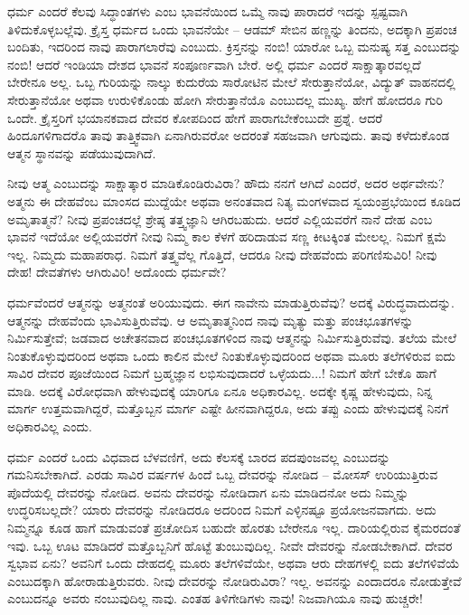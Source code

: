 ಧರ್ಮ ಎಂದರೆ ಕೆಲವು ಸಿದ್ಧಾಂತಗಳು ಎಂಬ ಭಾವನೆಯಿಂದ ಒಮ್ಮೆ ನಾವು ಪಾರಾದರೆ ಇದನ್ನು ಸ್ಪಷ್ಟವಾಗಿ ತಿಳಿದುಕೊಳ್ಳಬಲ್ಲೆವು. ಕ್ರೈಸ್ತ ಧರ್ಮದ ಒಂದು ಭಾವನೆಯೇ – ಆಡಮ್​ ಸೇಬಿನ ಹಣ್ಣನ್ನು ತಿಂದನು, ಅದಕ್ಕಾಗಿ ಪ್ರಪಂಚ ಬಂದಿತು, ಇದರಿಂದ ನಾವು ಪಾರಾಗಲಾರೆವು ಎಂಬುದು. ಕ್ರಿಸ್ತನನ್ನು ನಂಬಿ! ಯಾರೋ ಒಬ್ಬ ಮನುಷ್ಯ ಸತ್ತ ಎಂಬುದನ್ನು ನಂಬಿ! ಆದರೆ ಇಂಡಿಯಾ ದೇಶದ ಭಾವನೆ ಸಂಪೂರ್ಣವಾಗಿ ಬೇರೆ. ಅಲ್ಲಿ ಧರ್ಮ ಎಂದರೆ ಸಾಕ್ಷಾತ್ಕಾರವಲ್ಲದೆ ಬೇರೇನೂ ಅಲ್ಲ. ಒಬ್ಬ ಗುರಿಯನ್ನು ನಾಲ್ಕು ಕುದುರೆಯ ಸಾರೋಟಿನ ಮೇಲೆ ಸೇರುತ್ತಾನೆಯೋ, ವಿದ್ಯುತ್​ ವಾಹನದಲ್ಲಿ ಸೇರುತ್ತಾನೆಯೋ ಅಥವಾ ಉರುಳಿಕೊಂಡು ಹೋಗಿ ಸೇರುತ್ತಾನೆಯೊ ಎಂಬುದಲ್ಲ ಮುಖ್ಯ. ಹೇಗೆ ಹೋದರೂ ಗುರಿ ಒಂದೇ. ಕ್ರೈಸ್ತರಿಗೆ ಭಯಾನಕವಾದ ದೇವರ ಕೋಪದಿಂದ ಹೇಗೆ ಪಾರಾಗಬೇಕೆಂಬುದೇ ಪ್ರಶ್ನೆ. ಆದರೆ ಹಿಂದೂಗಳಿಗಾದರೊ ತಾವು ತಾತ್ತ್ವಿಕವಾಗಿ ಏನಾಗಿರುವರೋ ಅದರಂತೆ ಸಹಜವಾಗಿ ಆಗುವುದು. ತಾವು ಕಳೆದುಕೊಂಡ ಆತ್ಮನ ಸ್ಥಾನವನ್ನು ಪಡೆಯುವುದಾಗಿದೆ.

ನೀವು ಆತ್ಮ ಎಂಬುದನ್ನು ಸಾಕ್ಷಾತ್ಕಾರ ಮಾಡಿಕೊಂಡಿರುವಿರಾ? ಹೌದು ನನಗೆ ಆಗಿದೆ ಎಂದರೆ, ಅದರ ಅರ್ಥವೇನು? ಅತ್ಮನು ಈ ದೇಹವೆಂಬ ಮಾಂಸದ ಮುದ್ದೆಯೇ ಅಥವಾ ಅನಂತವಾದ ನಿತ್ಯ ಮಂಗಳವಾದ ಸ್ವಯಂಪ್ರಭೆಯಿಂದ ಕೂಡಿದ ಅಮೃತಾತ್ಮನೆ? ನೀವು ಪ್ರಪಂಚದಲ್ಲೆ ಶ್ರೇಷ್ಠ ತತ್ತ್ವಜ್ಞಾನಿ ಆಗಿರಬಹುದು. ಆದರೆ ಎಲ್ಲಿಯವರೆಗೆ ನಾನೆ ದೇಹ ಎಂಬ ಭಾವನೆ ಇದೆಯೋ ಅಲ್ಲಿಯವರೆಗೆ ನೀವು ನಿಮ್ಮ ಕಾಲ ಕೆಳಗೆ ಹರಿದಾಡುವ ಸಣ್ಣ ಕೀಟಕ್ಕಿಂತ ಮೇಲಲ್ಲ. ನಿಮಗೆ ಕ್ಷಮೆ ಇಲ್ಲ. ನಿಮ್ಮದು ಮಹಾಪರಾಧ. ನಿಮಗೆ ತತ್ತ್ವವೆಲ್ಲ ಗೊತ್ತಿದೆ, ಆದರೂ ನೀವು ದೇಹವೆಂದು ಪರಿಗಣಿಸುವಿರಿ! ನೀವು ದೇಹ! ದೇವತೆಗಳು ಆಗಿರುವಿರಿ! ಅದೊಂದು ಧರ್ಮವೇ?

ಧರ್ಮವೆಂದರೆ ಆತ್ಮನನ್ನು ಅತ್ಮನಂತೆ ಅರಿಯುವುದು. ಈಗ ನಾವೇನು ಮಾಡುತ್ತಿರುವೆವು? ಅದಕ್ಕೆ ವಿರುದ್ಧವಾದುದನ್ನು. ಆತ್ಮನನ್ನು ದೇಹವೆಂದು ಭಾವಿಸುತ್ತಿರುವೆವು. ಆ ಅಮೃತಾತ್ಮನಿಂದ ನಾವು ಮೃತ್ಯು ಮತ್ತು ಪಂಚಭೂತಗಳನ್ನು ನಿರ್ಮಿಸುತ್ತೇವೆ; ಜಡವಾದ ಅಚೇತನವಾದ ಪಂಚಭೂತಗಳಿಂದ ನಾವು ಆತ್ಮನನ್ನು ನಿರ್ಮಿಸುತ್ತಿರುವೆವು. ತಲೆಯ ಮೇಲೆ ನಿಂತುಕೊಳ್ಳುವುದರಿಂದ ಅಥವಾ ಒಂದು ಕಾಲಿನ ಮೇಲೆ ನಿಂತುಕೊಳ್ಳುವುದರಿಂದ ಅಥವಾ ಮೂರು ತಲೆಗಳಿರುವ ಐದು ಸಾವಿರ ದೇವರ ಪೂಜೆಯಿಂದ ನಿಮಗೆ ಬ್ರಹ್ಮಜ್ಞಾನ ಲಭಿಸುವುದಾದರೆ ಒಳ್ಳೆಯದು...! ನಿಮಗೆ ಹೇಗೆ ಬೇಕೊ ಹಾಗೆ ಮಾಡಿ. ಅದಕ್ಕೆ ವಿರೋಧವಾಗಿ ಹೇಳುವುದಕ್ಕೆ ಯಾರಿಗೂ ಏನೂ ಅಧಿಕಾರವಿಲ್ಲ. ಅದಕ್ಕೇ ಕೃಷ್ಣ ಹೇಳುವುದು, ನಿನ್ನ ಮಾರ್ಗ ಉತ್ತಮವಾಗಿದ್ದರೆ, ಮತ್ತೊಬ್ಬನ ಮಾರ್ಗ ಎಷ್ಟೇ ಹೀನವಾಗಿದ್ದರೂ, ಅದು ತಪ್ಪು ಎಂದು ಹೇಳುವುದಕ್ಕೆ ನಿನಗೆ ಅಧಿಕಾರವಿಲ್ಲ ಎಂದು.

ಧರ್ಮ ಎಂದರೆ ಒಂದು ವಿಧವಾದ ಬೆಳವಣಿಗೆ, ಅದು ಕೆಲಸಕ್ಕೆ ಬಾರದ ಪದಪುಂಜವಲ್ಲ ಎಂಬುದನ್ನು ಗಮನಿಸಬೇಕಾಗಿದೆ. ಎರಡು ಸಾವಿರ ವರ್ಷಗಳ ಹಿಂದೆ ಒಬ್ಬ ದೇವರನ್ನು ನೋಡಿದ – ಮೋಸಸ್​ ಉರಿಯುತ್ತಿರುವ ಪೊದೆಯಲ್ಲಿ ದೇವರನ್ನು ನೋಡಿದ. ಅವನು ದೇವರನ್ನು ನೋಡಿದಾಗ ಏನು ಮಾಡಿದನೋ ಅದು ನಿಮ್ಮನ್ನು ಉದ್ಧರಿಸಬಲ್ಲದೇ? ಯಾರು ದೇವರನ್ನು ನೋಡಿದರೂ ಅದರಿಂದ ನಿಮಗೆ ಎಳ್ಳಿನಷ್ಟೂ ಪ್ರಯೋಜನವಾಗದು. ಅದು ನಿಮ್ಮನ್ನೂ ಕೂಡ ಹಾಗೆ ಮಾಡುವಂತೆ ಪ್ರಚೋದಿಸ ಬಹುದೇ ಹೊರತು ಬೇರೇನೂ ಇಲ್ಲ. ದಾರಿಯಲ್ಲಿರುವ ಕೈಮರದಂತೆ ಇವು. ಒಬ್ಬ ಊಟ ಮಾಡಿದರೆ ಮತ್ತೊಬ್ಬನಿಗೆ ಹೊಟ್ಟೆ ತುಂಬುವುದಿಲ್ಲ. ನೀವೇ ದೇವರನ್ನು ನೋಡಬೇಕಾಗಿದೆ. ದೇವರ ಸ್ವಭಾವ ಏನು? ಅವನಿಗೆ ಒಂದು ದೇಹದಲ್ಲಿ ಮೂರು ತಲೆಗಳಿವೆಯೇ, ಅಥವಾ ಆರು ದೇಹಗಳಲ್ಲಿ ಐದು ತಲೆಗಳಿವೆಯೆ ಎಂಬುದಕ್ಕಾಗಿ ಹೋರಾಡುತ್ತಿರುವರು. ನೀವು ದೇವರನ್ನು ನೋಡಿರುವಿರಾ? ಇಲ್ಲ. ಅವನನ್ನು ಎಂದಾದರೂ ನೋಡುತ್ತೇವೆ ಎಂಬುದನ್ನೂ ಅವರು ನಂಬುವುದಿಲ್ಲ ನಾವು. ಎಂತಹ ತಿಳಿಗೇಡಿಗಳು ನಾವು! ನಿಜವಾಗಿಯೂ ನಾವು ಹುಚ್ಚರೇ!

